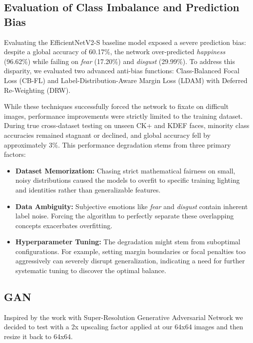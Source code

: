 \subsection{Evaluation of Class Imbalance and Prediction Bias}

Evaluating the EfficientNetV2-S baseline model exposed a severe prediction bias: despite a global accuracy of 60.17\%, the network over-predicted \textit{happiness} (96.62\%) while failing on \textit{fear} (17.20\%) and \textit{disgust} (29.99\%). To address this disparity, we evaluated two advanced anti-bias functions: Class-Balanced Focal Loss (CB-FL) and Label-Distribution-Aware Margin Loss (LDAM) with Deferred Re-Weighting (DRW). 

While these techniques successfully forced the network to fixate on difficult images, performance improvements were strictly limited to the training dataset. During true cross-dataset testing on unseen CK+ and KDEF faces, minority class accuracies remained stagnant or declined, and global accuracy fell by approximately 3\%. This performance degradation stems from three primary factors:
\begin{itemize}
    \item \textbf{Dataset Memorization:} Chasing strict mathematical fairness on small, noisy distributions caused the models to overfit to specific training lighting and identities rather than generalizable features.
    \item \textbf{Data Ambiguity:} Subjective emotions like \textit{fear} and \textit{disgust} contain inherent label noise. Forcing the algorithm to perfectly separate these overlapping concepts exacerbates overfitting.
\item \textbf{Hyperparameter Tuning:} The degradation might stem from suboptimal configurations. For example, setting margin boundaries or focal penalties too aggressively can severely disrupt generalization, indicating a need for further systematic tuning to discover the optimal balance.
\end{itemize}

\subsection{GAN}

Inspired by the work with Super-Resolution Generative Adversarial Network \cite{Siam2022EmotionDetection} we decided to test with a 2x upscaling factor applied at our 64x64 images and then resize it back to 64x64.



